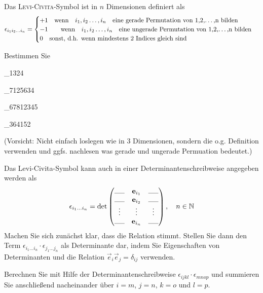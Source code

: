 \begin{atiTask}[
  title = Levi-Civita in n-Dimensionen,
  call = Zusatzaufgabe,
]

Das \textsc{Levi-Civita}-Symbol ist in $n$ Dimensionen definiert als
\[
\epsilon_{i_1i_2\dots i_n}=\begin{cases}
+1\quad \text{wenn}\quad  i_1,i_2\dots,i_n\quad \text{eine gerade Permutation von 1,2,\dots,n bilden}\\
-1 \quad \quad \text{wenn}\quad i_1,i_2\dots,i_n\quad \text{eine ungerade Permutation von 1,2,\dots,n bilden} \\
0 \quad \text{sonst, d.h. wenn mindestens 2 Indices gleich sind}
\end{cases}
\]
\begin{atiSubtasks}
	\item Bestimmen Sie 
	\begin{multicols}{4}
		\begin{atiSubequations}
			\item{\epsilon_{1324}}
			\item{\epsilon_{7125634}}
			\item{\epsilon_{67812345}}
			\item{\epsilon_{364152}}
		\end{atiSubequations}
		\end{multicols}
	(Vorsicht: Nicht einfach loslegen wie in 3 Dimensionen, sondern die o.g. Definition verwenden und ggfs. nachlesen was gerade und ungerade Permuation bedeutet.)
	\item Das Levi-Civita-Symbol kann auch in einer Determinantenschreibweise angegeben werden als
	\[
	\epsilon_{i_1\dots i_n}=\operatorname{det}\begin{pmatrix}
	\rule{0,5cm}{0.3pt} & \vec{e}_{i_1} &\rule{0,5cm}{0.3pt} \\
	\rule{0,5cm}{0.3pt} & \vec{e}_{i_2} & \rule{0,5cm}{0.3pt} \\
	\vdots & \vdots & \vdots \\
	\rule{0,5cm}{0.3pt} & \vec{e}_{i_n} &\rule{0,5cm}{0.3pt}
	\end{pmatrix}, \quad n\in \mathbb{N}
	\]
	Machen Sie sich zunächst klar, dass die Relation stimmt. Stellen Sie dann den Term $\epsilon_{i_1\dots i_n}\cdot\epsilon_{j_1\dots j_n}$ als Determinante dar, indem Sie Eigenschaften von Determinanten und die Relation $\vec{e}_i\vec{e}_j=\delta_{ij}$ verwenden. 
	\item Berechnen Sie mit Hilfe der Determinantenschreibweise $\epsilon_{ijkl}\cdot \epsilon_{mnop}$ und summieren Sie anschließend nacheinander über $i=m$, $j=n$, $k=o$ und $l=p$.

\end{atiSubtasks}
\end{atiTask}
